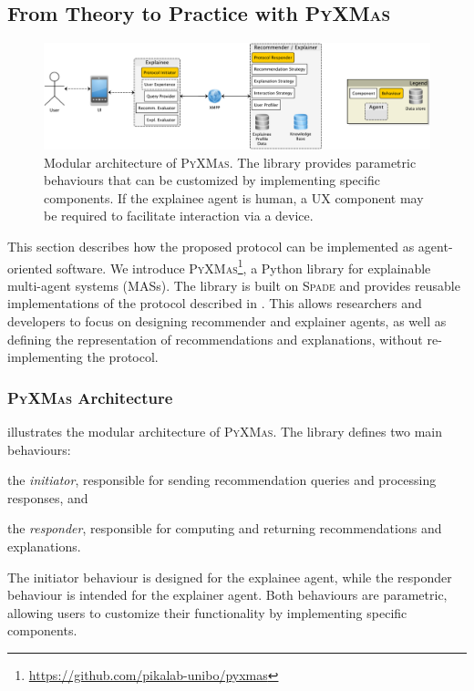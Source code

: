 \subsection{From Theory to Practice with \textsc{PyXMas}}
\label{subsec:from-theory-to-practice-with-pyxmas}
%
\begin{figure}
    \centering
    \includegraphics[width=\linewidth]{figures/pyxmas/architecture}
    \caption[Modular architecture of \textsc{PyXMas}]{%
        Modular architecture of \textsc{PyXMas}.
        The library provides parametric behaviours that can be customized by implementing specific components.
        If the explainee agent is human, a UX component may be required to facilitate interaction via a device.
    }
    \label{fig:architecture}
\end{figure}
%
This section describes how the proposed protocol can be implemented as agent-oriented software.
%
We introduce \textsc{PyXMas}\footnote{\url{https://github.com/pikalab-unibo/pyxmas}}, a Python library for explainable multi-agent systems (\glspl{MAS}).
%
The library is built on \textsc{Spade} and provides reusable implementations of the protocol described in .
%
This allows researchers and developers to focus on designing recommender and explainer agents, as well as defining the representation of recommendations and explanations, without re-implementing the protocol.


\subsubsection{\textsc{PyXMas} Architecture}
\label{subsubsec:pyxmas-architecture}
%
 illustrates the modular architecture of \textsc{PyXMas}.
%
The library defines two main behaviours:
%
\begin{inlinelist}
    \item the \emph{initiator}, responsible for sending recommendation queries and processing responses, and
    \item the \emph{responder}, responsible for computing and returning recommendations and explanations.
\end{inlinelist}
%
The initiator behaviour is designed for the explainee agent, while the responder behaviour is intended for the explainer agent.
%
Both behaviours are parametric, allowing users to customize their functionality by implementing specific components.

